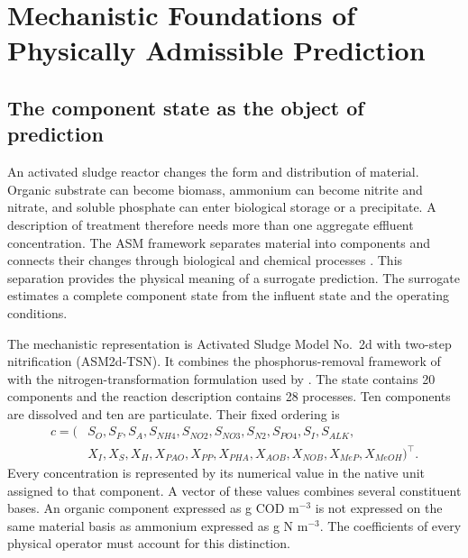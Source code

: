 \chapter{Mechanistic Foundations of Physically Admissible Prediction}
\label{ch:foundations}

\section{The component state as the object of prediction}

An activated sludge reactor changes the form and distribution of material. Organic substrate can become biomass, ammonium can become nitrite and nitrate, and soluble phosphate can enter biological storage or a precipitate. A description of treatment therefore needs more than one aggregate effluent concentration. The ASM framework separates material into components and connects their changes through biological and chemical processes \citep{Henze2006}. This separation provides the physical meaning of a surrogate prediction. The surrogate estimates a complete component state from the influent state and the operating conditions.

The mechanistic representation is Activated Sludge Model No.\ 2d with two-step nitrification (ASM2d-TSN). It combines the phosphorus-removal framework of \citet{Henze2006} with the nitrogen-transformation formulation used by \citet{Guerrero2011}. The state contains 20 components and the reaction description contains 28 processes. Ten components are dissolved and ten are particulate. Their fixed ordering is
\begin{equation}
\begin{split}
c=(&S_O,S_F,S_A,S_{NH4},S_{NO2},S_{NO3},S_{N2},S_{PO4},S_I,S_{ALK},\\
&X_I,X_S,X_H,X_{PAO},X_{PP},X_{PHA},X_{AOB},X_{NOB},X_{MeP},X_{MeOH})^\top.
\end{split}
\label{eq:component_order}
\end{equation}
Every concentration is represented by its numerical value in the native unit assigned to that component. A vector of these values combines several constituent bases. An organic component expressed as g COD m$^{-3}$ is not expressed on the same material basis as ammonium expressed as g N m$^{-3}$. The coefficients of every physical operator must account for this distinction.

